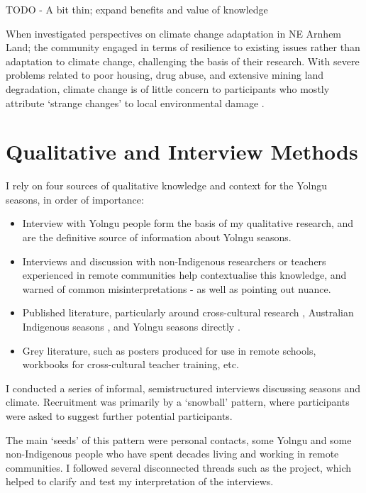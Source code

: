 TODO - A bit thin; expand benefits and value of knowledge

When \citet{petheram2010} investigated perspectives on climate change 
adaptation in NE Arnhem Land; the community engaged in terms of resilience to 
existing issues rather than adaptation to climate change, challenging the basis 
of their research.  With severe problems related to poor housing, drug abuse, 
and extensive mining land degradation, climate change is of little concern to 
participants who mostly attribute `strange changes' to local environmental 
damage \citep{green2010a}.




\section{Qualitative and Interview Methods}

I rely on four sources of qualitative knowledge and context for the Yolngu
seasons, in order of importance:

\begin{itemize}
\item Interview with Yolngu people form the basis of my qualitative research, and
        are the definitive source of information about Yolngu seasons.
\item Interviews and discussion with non-Indigenous researchers or teachers experienced
        in remote communities help contextualise this knowledge, and warned of
        common misinterpretations - as well as pointing out nuance.
\item Published literature, particularly around cross-cultural research \citep[eg.][]{smith1999},
        Australian Indigenous seasons \citep[eg.][]{prober2011,oconnor2010}, and Yolngu
        seasons directly \citep{davis1989}.
\item Grey literature, such as posters produced for use in remote schools, workbooks
        for cross-cultural teacher training, etc.
\end{itemize}


I conducted a series of informal, semistructured interviews discussing
seasons and climate. Recruitment was primarily by a `snowball' pattern,
where participants were asked to suggest further potential participants.

The main `seeds' of this pattern were personal contacts, some Yolngu and some
non-Indigenous people who have spent decades living and working in remote
communities. I followed several disconnected threads such as the
\citet{CSIROcals} project, which helped to clarify and test my interpretation
of the interviews.

